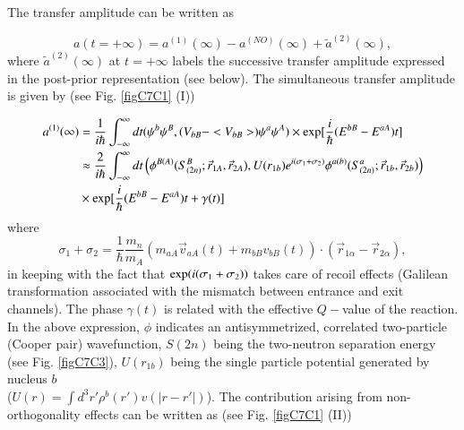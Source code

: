 \begin{subappendices}
The transfer amplitude can be written as  


\begin{equation}
a(t = + \infty) = a^{(1)}(\infty) - a^{(NO)}(\infty) + \tilde a^{(2)} ( \infty),
\label{A3}
\end{equation}
where $\tilde a^{(2)}(\infty)$ at $t= + \infty$ 
labels  the successive transfer amplitude expressed in the post-prior representation (see below).
The simultaneous transfer amplitude is given by (see Fig. \ref{figC7C1} (I))

\begin{equation}\label{eq7.C.4}
\begin{split}
a^{(1)} (\infty)& = \frac{1}{i \hbar} \int^{\infty}_{-\infty} dt (\psi^b \psi^B, (V_{bB} - <V_{bB}>) \psi^a \psi^A ) \times 
{\rm exp} [\frac{i}{\hbar} (E^{bB} - E^{aA}) t]  \\
&\approx \frac{2}{i \hbar} \int^{\infty}_{- \infty}  dt \left( \phi^{B(A)} (S^B_{(2n)}; \vec r_{1A}, \vec r_{2A}), U(r_{1b}) 
e^{i (\sigma_1 + \sigma_2)}
\phi^{a(b)} (S^a_{(2n)}; \vec r_{1b}, \vec r_{2b}) \right)\\
&\times {\rm exp} [\frac{i}{\hbar} (E^{bB} - E^{aA}) t + \gamma(t)] 
\end{split}
\end{equation}
where 
\begin{equation}
\sigma_1 + \sigma_2 = \frac{1}{\hbar} \frac{m_n}{m_A} ( m_{aA} \vec v_{aA} (t) + m_{bB} v_{bB}(t)) \cdot (\vec r_{1\alpha}
-\vec r_{2 \alpha}),
\end{equation}
in keeping with the fact that ${\rm exp} ( i (\sigma_1 + \sigma_2))$ takes care of recoil 
effects (Galilean transformation associated with the mismatch between entrance and exit channels). 
The phase $\gamma (t)$ is related  with the effective $Q-$value of the reaction. In the above expression, $\phi$ indicates an antisymmetrized, correlated two-particle (Cooper pair)  wavefunction, $S(2n)$ being the two-neutron separation energy (see Fig. \ref{figC7C3}), $U(r_{1b})$ being the single particle potential generated by nucleus $b$\\ (\mbox{$U(r) = \int d^3 r' \rho^b(r') v(|r-r'|)$}). The contribution arising from non-orthogonality effects can be written as (see Fig. \ref{figC7C1} (II))


\end{subappendices}
